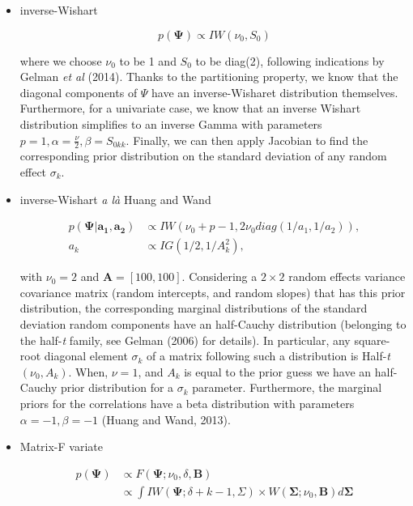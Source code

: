 \documentclass[a4paper]{article}
\begin{document}
\begin{itemize}
	\item inverse-Wishart
	
\begin{equation}
p(\bm{\Psi}) \propto IW(\nu_0, S_{0})
\end{equation}	

where we choose $\nu_0$ to be 1 and $S_{0}$ to be diag(2), following indications by Gelman \textit{et al} (2014). Thanks to the partitioning property, we know that the diagonal components of $\Psi$ have an inverse-Wisharet distribution themselves. Furthermore, for a univariate case, we know that an inverse Wishart distribution simplifies to an inverse Gamma with parameters $p=1, \alpha=\frac{\nu}{2}, \beta = S_{0kk}$. Finally, we can then apply Jacobian to find the corresponding prior distribution on the standard deviation of any random effect $\sigma_k$.

	\item inverse-Wishart \textit{a là} Huang and Wand

\begin{equation}
	\begin{split}
	p(\bm{\Psi|a_1, a_2})& \propto IW(\nu_0 + p - 1, 2\nu_0 diag(1/a_1, 1/a_2)), \\
	a_k& \propto IG(1/2,1/A_k^2),
	\end{split}
\end{equation}

with $\nu_0 = 2$ and $\bm{A} = [100, 100]$. Considering a $2 \times 2$ random effects variance covariance matrix (random intercepts, and random slopes) that has this prior distribution, the corresponding marginal distributions of the standard deviation random components have an half-Cauchy distribution (belonging to the half-\textit{t} family, see Gelman (2006) for details). In particular, any square-root diagonal element $\sigma_k$ of a matrix following such a distribution is Half-\textit{t}$(\nu_0, A_k)$. When, $\nu = 1$, and $A_k$ is equal to the prior guess we have an half-Cauchy prior distribution for a $\sigma_k$ parameter. Furthermore, the marginal priors for the correlations have a beta distribution with parameters $\alpha = -1, \beta = -1$ (Huang and Wand, 2013).
	
	\item Matrix-F variate
	
\begin{equation}
\begin{split}
p(\bm{\Psi})& \propto F(\bm{\Psi}; \nu_0, \delta, \bm{B}) \\
& \propto \int IW(\bm{\Psi}; \delta + k - 1, \Sigma) \times W(\bm{\Sigma}; \nu_0, \bm{B})d\bm{\Sigma}
\end{split}
\end{equation}	
\end{itemize}
\end{document}
